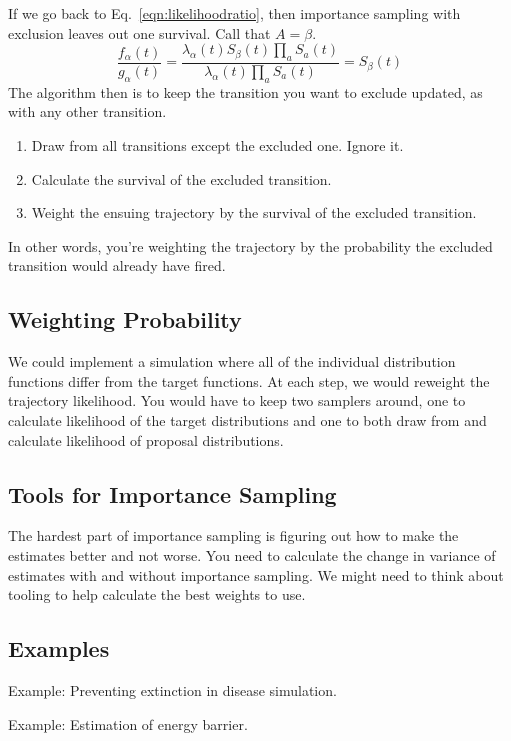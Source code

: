 \documentclass{article}
\begin{document}
If we go back to Eq.~\ref{eqn:likelihoodratio}, then importance sampling with exclusion leaves out one survival. Call that $A=\beta$.
\begin{equation}
	\frac{f_\alpha(t)}{g_\alpha(t)} = \frac{\lambda_{\alpha}(t)S_\beta(t)\prod_{a}S_a(t)}{\lambda_{\alpha}(t)\prod_{a}S_a(t)} = S_\beta(t)
\end{equation}
The algorithm then is to keep the transition you want to exclude updated, as with any other transition.
\begin{enumerate}
	\item Draw from all transitions except the excluded one. Ignore it.
	\item Calculate the survival of the excluded transition.
	\item Weight the ensuing trajectory by the survival of the excluded transition.
\end{enumerate}
In other words, you're weighting the trajectory by the probability the excluded transition would already have fired.

\subsection{Weighting Probability}

We could implement a simulation where all of the individual distribution functions differ from the target functions. At each step, we would reweight the trajectory likelihood. You would have to keep two samplers around, one to calculate likelihood of the target distributions and one to both draw from and calculate likelihood of proposal distributions.

\subsection{Tools for Importance Sampling}

The hardest part of importance sampling is figuring out how to make the estimates better and not worse. You need to calculate the change in variance of estimates with and without importance sampling. We might need to think about tooling to help calculate the best weights to use.


\subsection{Examples}
Example: Preventing extinction in disease simulation.

Example: Estimation of energy barrier.
\end{document}

